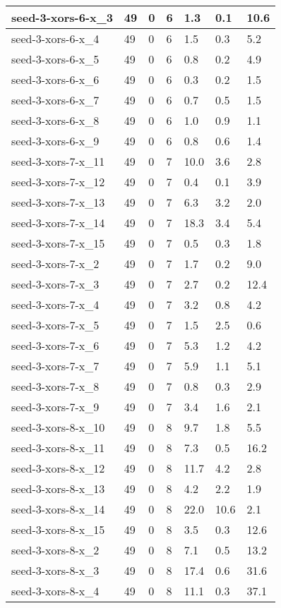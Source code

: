 \begin{scriptsize}
\begin{longtable}{|p{5cm}|l|l|l|l|l|l|}
seed-3-xors-6-x\_3&49&0&6&1.3&0.1&10.6 \\ \hline 
seed-3-xors-6-x\_4&49&0&6&1.5&0.3&5.2 \\ \hline 
seed-3-xors-6-x\_5&49&0&6&0.8&0.2&4.9 \\ \hline 
seed-3-xors-6-x\_6&49&0&6&0.3&0.2&1.5 \\ \hline 
seed-3-xors-6-x\_7&49&0&6&0.7&0.5&1.5 \\ \hline 
seed-3-xors-6-x\_8&49&0&6&1.0&0.9&1.1 \\ \hline 
seed-3-xors-6-x\_9&49&0&6&0.8&0.6&1.4 \\ \hline 
seed-3-xors-7-x\_11&49&0&7&10.0&3.6&2.8 \\ \hline 
seed-3-xors-7-x\_12&49&0&7&0.4&0.1&3.9 \\ \hline 
seed-3-xors-7-x\_13&49&0&7&6.3&3.2&2.0 \\ \hline 
seed-3-xors-7-x\_14&49&0&7&18.3&3.4&5.4 \\ \hline 
seed-3-xors-7-x\_15&49&0&7&0.5&0.3&1.8 \\ \hline 
seed-3-xors-7-x\_2&49&0&7&1.7&0.2&9.0 \\ \hline 
seed-3-xors-7-x\_3&49&0&7&2.7&0.2&12.4 \\ \hline 
seed-3-xors-7-x\_4&49&0&7&3.2&0.8&4.2 \\ \hline 
seed-3-xors-7-x\_5&49&0&7&1.5&2.5&0.6 \\ \hline 
seed-3-xors-7-x\_6&49&0&7&5.3&1.2&4.2 \\ \hline 
seed-3-xors-7-x\_7&49&0&7&5.9&1.1&5.1 \\ \hline 
seed-3-xors-7-x\_8&49&0&7&0.8&0.3&2.9 \\ \hline 
seed-3-xors-7-x\_9&49&0&7&3.4&1.6&2.1 \\ \hline 
seed-3-xors-8-x\_10&49&0&8&9.7&1.8&5.5 \\ \hline 
seed-3-xors-8-x\_11&49&0&8&7.3&0.5&16.2 \\ \hline 
seed-3-xors-8-x\_12&49&0&8&11.7&4.2&2.8 \\ \hline 
seed-3-xors-8-x\_13&49&0&8&4.2&2.2&1.9 \\ \hline 
seed-3-xors-8-x\_14&49&0&8&22.0&10.6&2.1 \\ \hline 
seed-3-xors-8-x\_15&49&0&8&3.5&0.3&12.6 \\ \hline 
seed-3-xors-8-x\_2&49&0&8&7.1&0.5&13.2 \\ \hline 
seed-3-xors-8-x\_3&49&0&8&17.4&0.6&31.6 \\ \hline 
seed-3-xors-8-x\_4&49&0&8&11.1&0.3&37.1 \\ \hline 

\end{longtable}
\end{scriptsize}
